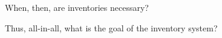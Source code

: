 \begin{exercise}
When, then, are inventories necessary?

\end{exercise}


\begin{exercise}
Thus, all-in-all, what is the goal of the inventory system?

\end{exercise}


